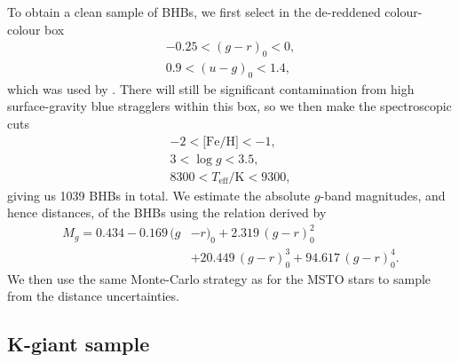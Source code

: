 \documentclass[useAMS,twocolumn,usenatbib]{mn2e}
\begin{document}
To obtain a clean sample of BHBs, we first select in the de-reddened colour-colour box
%
\begin{gather}
-0.25 < (g-r)_0 < 0, \nonumber \\
0.9 < (u-g)_0 < 1.4,
\end{gather}
%
which was used by \cite{De11}. 
There will still be significant contamination from high surface-gravity blue stragglers within this box, so we then make the spectroscopic cuts
%
\begin{gather}
-2 < \lbrack \mathrm{Fe/H} \rbrack < -1, \nonumber \\
3 < \log g < 3.5, \\
8300 < T_\mathrm{eff}/\mathrm{K} < 9300, \nonumber
\end{gather}
%
giving us 1039 BHBs in total. 
We estimate the absolute $g$-band magnitudes, and hence distances, of the BHBs using the relation derived by \cite{De11}
%
\begin{equation}
\begin{split}
M_g = 0.434 - 0.169\,(g{}&-r)_0+2.319\,(g-r)_0^2  \\
         {}&+20.449\,(g-r)_0^3+94.617\,(g-r)_0^4.
\end{split}
\end{equation}
%
We then use the same Monte-Carlo strategy as for the MSTO stars to sample from the distance uncertainties.


\subsection{K-giant sample}
\end{document}
